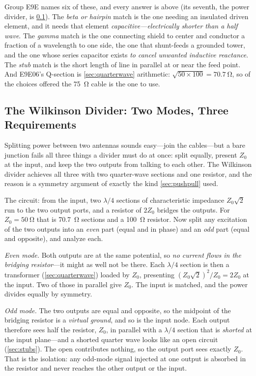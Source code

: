 \begin{exambox}
Group E9E names six of these, and every answer is above (its seventh, the power
divider, is \cref{sec:wilkinson}). The \emph{beta or hairpin}
match is the one needing an insulated driven element, and it needs that element
\emph{capacitive---electrically shorter than a half wave}. The \emph{gamma} match is
the one connecting shield to center and conductor a fraction of a wavelength to one
side, the one that shunt-feeds a grounded tower, and the one whose series capacitor
exists \emph{to cancel unwanted inductive reactance}. The \emph{stub} match is the
short length of line in parallel at or near the feed point. And E9E06's Q-section is
\cref{sec:quarterwave} arithmetic: \(\sqrt{50\times100}=\SI{70.7}{\ohm}\), so of the
choices offered the \SI{75}{\ohm} cable is the one to use.
\end{exambox}

\subsection{The Wilkinson Divider: Two Modes, Three Requirements}
\label{sec:wilkinson}
Splitting power between two antennas sounds easy---join the cables---but a bare
junction fails all three things a divider must do at once: split equally, present
\(Z_0\) at the input, and keep the two outputs from talking to each other. The
Wilkinson divider achieves all three with two quarter-wave sections and one resistor,
and the reason is a symmetry argument of exactly the kind \cref{sec:pushpull} used.

The circuit: from the input, two \(\lambda/4\) sections of characteristic impedance
\(Z_0\sqrt2\) run to the two output ports, and a resistor of \(2Z_0\) bridges the
outputs. For \(Z_0=\SI{50}{\ohm}\) that is \SI{70.7}{\ohm} sections and a
\SI{100}{\ohm} resistor. Now split any excitation of the two outputs into an
\emph{even} part (equal and in phase) and an \emph{odd} part (equal and opposite), and
analyze each.

\emph{Even mode.} Both outputs are at the same potential, so \emph{no current flows in
the bridging resistor}---it might as well not be there. Each \(\lambda/4\) section is
then a transformer (\cref{sec:quarterwave}) loaded by \(Z_0\), presenting
\((Z_0\sqrt2)^2/Z_0=2Z_0\) at the input. Two of those in parallel give \(Z_0\). The
input is matched, and the power divides equally by symmetry.

\emph{Odd mode.} The two outputs are equal and opposite, so the midpoint of the
bridging resistor is a \emph{virtual ground}, and so is the input node. Each output
therefore sees half the resistor, \(Z_0\), in parallel with a \(\lambda/4\) section
that is \emph{shorted} at the input plane---and a shorted quarter wave looks like an
open circuit (\cref{sec:stubs}). The open contributes nothing, so the output port sees
exactly \(Z_0\). That is the isolation: any odd-mode signal injected at one output is
absorbed in the resistor and never reaches the other output or the input.

